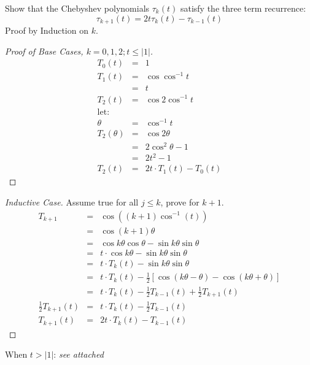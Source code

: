\documentclass{article}
\newcommand{\ea}[1]{\begin{eqnarray*}#1\end{eqnarray*}}
\newcommand{\inv}[1]{#1^{-1}}
\newcommand{\abs}[1]{\vert{#1}\vert}
\begin{document}
 Show that the Chebyshev polynomials $\tau_k(t)$ satisfy the three
term recurrence:
\[
	\tau_{k+1}(t) = 2t\tau_k(t) - \tau_{k-1}(t)
\]
Proof by Induction on $k$.\\
\begin{proof}[Proof of Base Cases, $k=0,1,2; t\le \abs{1}$]
\ea{
	T_0(t) &=& 1\\
	T_1(t) &=& \cos \inv{\cos} t \\
		   &=& t \\
	T_2(t) &=& \cos 2\inv{\cos} t \\ 
	\textrm{let:}\\
	\theta &=& \inv{\cos} t \\
	T_2(\theta) &=& \cos 2 \theta \\
	 	   &=& 2 \cos^2 \theta - 1 \\
		   &=& 2 t^2 - 1\\
	T_2(t) &=& 2 t \cdot T_1(t) - T_0(t)
}
\end{proof}
\begin{proof}[Inductive Case]
	Assume true for all $j\le k$, prove for $k+1$.
\ea{
T_{k+1} &=& \cos \left( (k+1) \inv{\cos}(t) \right)\\
	&=& \cos (k+1)\theta \\
	&=& \cos k\theta\cos\theta - \sin k\theta\sin\theta \\
	&=& t\cdot\cos k\theta - \sin k\theta\sin\theta \\
	&=& t\cdot T_k(t) - \sin k\theta\sin\theta \\
	&=& t\cdot T_k(t) - \frac{1}{2}\left[\cos( k\theta - \theta ) - \cos( k\theta + \theta ) \right] \\
	&=&  t\cdot T_k(t) - \frac{1}{2}T_{k-1}(t) + \frac{1}{2}T_{k+1}(t) \\
	\frac{1}{2} T_{k+1}(t) &=& t\cdot T_k(t) - \frac{1}{2}T_{k-1}(t) \\
	T_{k+1}(t) &=&  2t\cdot T_k(t) - T_{k-1}(t)
}
\end{proof}
When $t > |1|$:
	\textit{ see attached }
\end{document}
